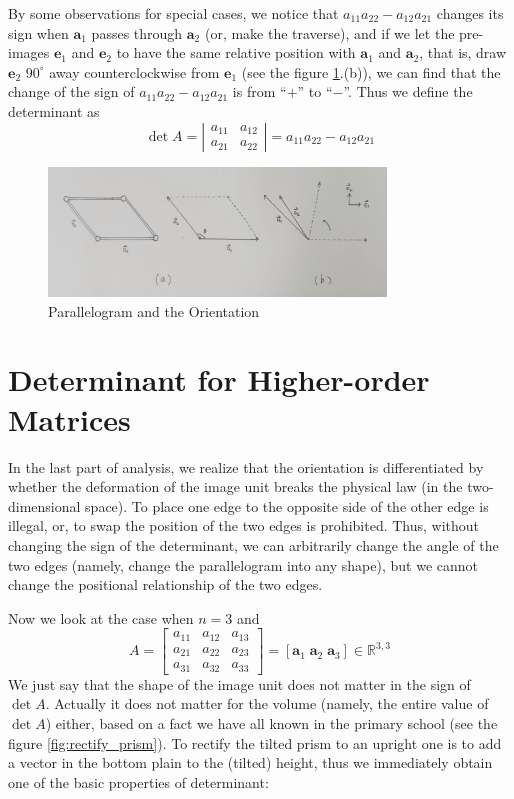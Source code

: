 \documentclass{article}
\begin{document}
By some observations for special cases, we notice that $a_{11}a_{22}-a_{12}a_{21}$ changes its sign when $\pmb{a}_1$ passes through $\pmb{a}_2$ (or, make the traverse), and if we let the pre-images $\pmb{e}_1$ and $\pmb{e}_2$ to have the same relative position with $\pmb{a}_1$ and $\pmb{a}_2$, that is, draw $\pmb{e}_2$ $90^\circ$ away counterclockwise from $\pmb{e}_1$ (see the figure \ref{fig:para_ori}.(b)), we can find that the change of the sign of $a_{11}a_{22}-a_{12}a_{21}$ is from ``$+$'' to ``$-$''. Thus we define the determinant as
$$ \det A = \left|\begin{array}{cc}
    a_{11} & a_{12} \\
    a_{21} & a_{22}
\end{array}\right| = a_{11}a_{22}-a_{12}a_{21} $$

\begin{figure}[H]
    \centering
    \includegraphics[width=0.8\textwidth]{figs_I1/1.jpg}
    \caption{Parallelogram and the Orientation}
    \label{fig:para_ori}
\end{figure}

\section{Determinant for Higher-order Matrices}
In the last part of analysis, we realize that the orientation is differentiated by whether the deformation of the image unit breaks the physical law (in the two-dimensional space). To place one edge to the opposite side of the other edge is illegal, or, to swap the position of the two edges is prohibited. Thus, without changing the sign of the determinant, we can arbitrarily change the angle of the two edges (namely, change the parallelogram into any shape), but we cannot change the positional relationship of the two edges. 

Now we look at the case when $n=3$ and 
$$ A = \begin{bmatrix}
    a_{11} & a_{12} & a_{13} \\
    a_{21} & a_{22} & a_{23} \\
    a_{31} & a_{32} & a_{33}
\end{bmatrix} = [\pmb{a}_1 \;\pmb{a}_2 \;\pmb{a}_3]\in\mathbb{R}^{3,3} $$
We just say that the shape of the image unit does not matter in the sign of $\det A$. Actually it does not matter for the volume (namely, the entire value of $\det A$) either, based on a fact we have all known in the primary school (see the figure \ref{fig:rectify_prism}). To rectify the tilted prism to an upright one is to add a vector in the bottom plain to the (tilted) height, thus we immediately obtain one of the basic properties of determinant:
\end{document}
